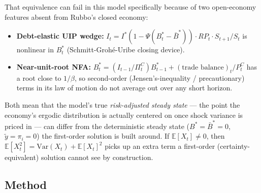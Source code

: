 \documentclass[12pt]{article}
\begin{document}
That equivalence can fail in this model specifically because of two open-economy features absent from Rubbo's closed economy:
\begin{itemize}
    \item \textbf{Debt-elastic UIP wedge:} $I_t = I^*(1-\Psi(B^*_t-\bar{B}^*))\cdot RP_t\cdot S_{t+1}/S_t$ is nonlinear in $B^*_t$ (Schmitt-Grohé-Uribe closing device).
    \item \textbf{Near-unit-root NFA:} $B^*_t = (I_{t-1}/\Pi^C_t)B^*_{t-1} + (\text{trade balance})_t/P^C_t$ has a root close to $1/\beta$, so second-order (Jensen's-inequality / precautionary) terms in its law of motion do not average out over any short horizon.
\end{itemize}
Both mean that the model's true \emph{risk-adjusted steady state} --- the point the economy's ergodic distribution is actually centered on once shock variance is priced in --- can differ from the deterministic steady state ($B^*=\bar{B}^*=0$, $\tilde{y}=\pi_i=0$) the first-order solution is built around. If $\mathbb{E}[X_t]\neq 0$, then $\mathbb{E}[X_t^2]=\mathrm{Var}(X_t)+\mathbb{E}[X_t]^2$ picks up an extra term a first-order (certainty-equivalent) solution cannot see by construction.

\subsection{Method}
\end{document}
